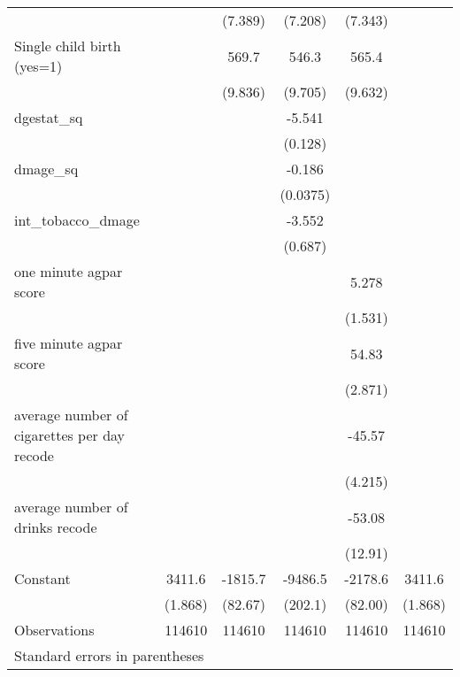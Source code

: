 \begin{tabular}{l*{5}{c}}
                    &            &     (7.389)&     (7.208)&     (7.343)&            \\
[1em]
Single child birth (yes=1)&            &       569.7&       546.3&       565.4&            \\
                    &            &     (9.836)&     (9.705)&     (9.632)&            \\
[1em]
dgestat\_sq          &            &            &      -5.541&            &            \\
                    &            &            &     (0.128)&            &            \\
[1em]
dmage\_sq            &            &            &      -0.186&            &            \\
                    &            &            &    (0.0375)&            &            \\
[1em]
int\_tobacco\_dmage   &            &            &      -3.552&            &            \\
                    &            &            &     (0.687)&            &            \\
[1em]
one minute agpar score&            &            &            &       5.278&            \\
                    &            &            &            &     (1.531)&            \\
[1em]
five minute agpar score&            &            &            &       54.83&            \\
                    &            &            &            &     (2.871)&            \\
[1em]
average number of cigarettes per day recode&            &            &            &      -45.57&            \\
                    &            &            &            &     (4.215)&            \\
[1em]
average number of drinks recode&            &            &            &      -53.08&            \\
                    &            &            &            &     (12.91)&            \\
[1em]
Constant            &      3411.6&     -1815.7&     -9486.5&     -2178.6&      3411.6\\
                    &     (1.868)&     (82.67)&     (202.1)&     (82.00)&     (1.868)\\
\hline
Observations        &      114610&      114610&      114610&      114610&      114610\\
\hline\hline
\multicolumn{6}{l}{\footnotesize Standard errors in parentheses}\\
\end{tabular}
